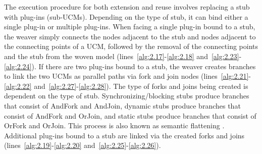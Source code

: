 The execution procedure for both extension and reuse involves replacing a stub with plug-ins (sub-UCMs). Depending on the type of stub, it can bind either a single plug-in or multiple plug-ins. When facing a single plug-in bound to a stub, the weaver simply connects the nodes adjacent to the stub and nodes adjacent to the connecting points of a UCM, followed by the removal of the connecting points and the stub from the woven model (lines~\ref{alg:2.17}-\ref{alg:2.18} and~\ref{alg:2.23}-\ref{alg:2.24}). If there are two plug-ins bound to a stub, the weaver creates branches to link the two UCMs as parallel paths via fork and join nodes (lines~\ref{alg:2.21}-\ref{alg:2.22} and~\ref{alg:2.27}-\ref{alg:2.28}). The type of forks and joins being created is dependent on the type of stub. Synchronizing/blocking stubs produce branches that consist of {\cls AndFork} and {\cls AndJoin}, dynamic stubs produce branches that consist of {\cls AndFork} and {\cls OrJoin}, and static stubs produce branches that consist of {\cls OrFork} and {\cls OrJoin}. This process is also known as semantic flattening \cite{itu2012151}. Additional plug-ins bound to a stub are linked via the created forks and joins (lines~\ref{alg:2.19}-\ref{alg:2.20} and~\ref{alg:2.25}-\ref{alg:2.26}).
